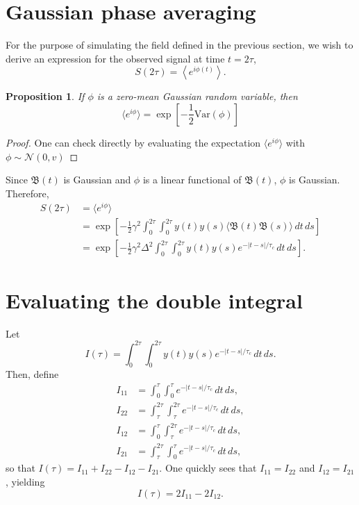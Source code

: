 \documentclass[12pt,reqno]{amsart}
\theoremstyle{plain}
\newtheorem{proposition}{Proposition}
\begin{document}
\section{Gaussian phase averaging}
For the purpose of simulating the field defined in the previous section, we wish to derive an expression for the observed signal at time $t=2\tau$,
\begin{equation*}
    S(2\tau) = \left\langle e^{i\phi(t)}\right\rangle.
\end{equation*}

\begin{proposition}{}
    If $\phi$ is a zero-mean Gaussian random variable, then
    \begin{equation*}
        \langle e^{i\phi}\rangle = \exp{\left[-\frac{1}{2}\mathrm{Var}(\phi)\right]}
    \end{equation*}
\end{proposition}
\begin{proof}
    One can check directly by evaluating the expectation $\langle e^{i\phi}\rangle$ with $\phi\sim\mathcal{N}(0,v)$
\end{proof}

Since $\mathfrak{B}(t)$ is Gaussian and $\phi$ is a linear functional of $\mathfrak{B}(t)$, $\phi$ is Gaussian. Therefore,
\begin{align*}
    S(2\tau) &= \langle e^{i\phi}\rangle\\
    &= \exp{\left[ -\frac{1}{2}\gamma^2 \int_{0}^{2\tau}\int_{0}^{2\tau} y(t)y(s)\langle\mathfrak{B}(t)\mathfrak{B}(s)\rangle\, dt\,ds \right]}\\
    &= \exp{\left[ -\frac{1}{2}\gamma^2 \Delta^2\int_{0}^{2\tau}\int_{0}^{2\tau} y(t)y(s)e^{-\lvert t-s \rvert/\tau_c}\, dt\,ds \right]}.
\end{align*}

\section{Evaluating the double integral}
Let
\begin{equation*}
    I(\tau) = \int_{0}^{2\tau}\int_{0}^{2\tau} y(t)y(s)e^{-\lvert t-s \rvert/\tau_c}\, dt\,ds.
\end{equation*}
Then, define
\begin{align*}
    I_{11} &= \int_{0}^{\tau}\int_{0}^{\tau} e^{-\lvert t-s \rvert/\tau_c}\, dt\,ds,\\
    I_{22} &= \int_{\tau}^{2\tau}\int_{\tau}^{2\tau} e^{-\lvert t-s \rvert/\tau_c}\, dt\,ds,\\
    I_{12} &= \int_{0}^{\tau}\int_{\tau}^{2\tau} e^{-\lvert t-s \rvert/\tau_c}\, dt\,ds,\\
    I_{21} &= \int_{\tau}^{2\tau}\int_{0}^{\tau} e^{-\lvert t-s \rvert/\tau_c}\, dt\,ds,
\end{align*}
so that $I(\tau) = I_{11} + I_{22} - I_{12} - I_{21}$. One quickly sees that $I_{11} = I_{22}$ and $I_{12} = I_{21}$, yielding
\begin{equation*}
    I(\tau) = 2I_{11} - 2I_{12}.
\end{equation*}
\end{document}
